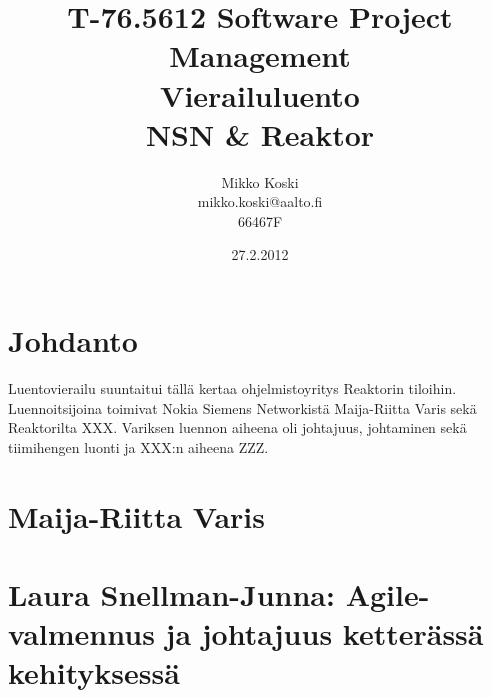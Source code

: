 \documentclass[a4paper]{article}
\begin{document}
\title{\small T-76.5612 Software Project Management \\ Vierailuluento \\ \huge NSN & Reaktor}
\date{27.2.2012}
\author{Mikko Koski \\ mikko.koski@aalto.fi \\ 66467F}
\maketitle

\normalsize

\section{Johdanto}

Luentovierailu suuntaitui tällä kertaa ohjelmistoyritys Reaktorin tiloihin. Luennoitsijoina toimivat Nokia Siemens Networkistä Maija-Riitta Varis sekä Reaktorilta XXX. Variksen luennon aiheena oli johtajuus, johtaminen sekä tiimihengen luonti ja XXX:n aiheena ZZZ.

\section{Maija-Riitta Varis}


\section{Laura Snellman-Junna: Agile-valmennus ja johtajuus ketterässä kehityksessä}





\end{document}
